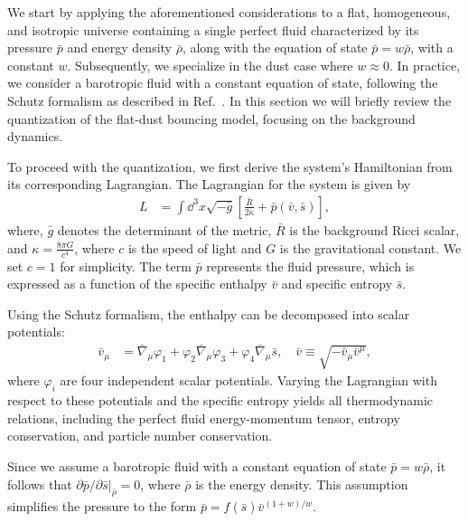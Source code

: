 \documentclass[a4paper,11pt]{article}
\begin{document}
{\color{red} We start by applying the aforementioned considerations to a flat,
	homogeneous, and isotropic universe containing a single perfect fluid characterized by
	its pressure $\bar{p}$ and energy density $\bar{\rho}$, along with the equation of state
	$\bar{p} = w\bar{\rho}$, with a constant $w$. Subsequently, we specialize in the dust
	case where $w \approx 0$. In practice, we consider a barotropic fluid with a constant
	equation of state, following the Schutz formalism as described in
	Ref.~\cite{fluidgeral}. In this section we will briefly review the quantization of the
	flat-dust bouncing model, focusing on the background dynamics.

	To proceed with the quantization, we first derive the system's Hamiltonian
	from its corresponding Lagrangian. The Lagrangian for the system is given by
	\begin{align}\label{lagrangian}
		L & = \int \dd^3x \sqrt{-\bar{g}} \left[\frac{\bar{R}}{2\kappa}
			+ \bar{p}(\bar{v}, \bar{s})\right],
	\end{align}
	where, $\bar{g}$ denotes the determinant of the metric, $\bar{R}$ is the background
	Ricci scalar, and $\kappa = \frac{8 \pi G}{c^4}$, where $c$ is the speed of
	light and $G$ is the gravitational constant. We set $c = 1$ for simplicity. The
	term $\bar{p}$ represents the fluid pressure, which is expressed as a function of
	the specific enthalpy $\bar{v}$ and specific entropy $\bar{s}$.

	Using the Schutz formalism, the enthalpy can be decomposed into scalar potentials:
	\begin{align}
		\bar{v}_\mu & = \bar\nabla_\mu \varphi_1
		+ \varphi_2 \bar\nabla_\mu \varphi_3
		+ \varphi_4 \bar\nabla_\mu \bar{s},
		\quad \bar{v} \equiv \sqrt{-\bar{v}_\mu \bar{v}^\mu},
	\end{align}
	where $\varphi_i$ are four independent scalar potentials. Varying the Lagrangian with
	respect to these potentials and the specific entropy yields all thermodynamic relations,
	including the perfect fluid energy-momentum tensor, entropy conservation, and particle
	number conservation.

	Since we assume a barotropic fluid with a constant equation of state $\bar{p} = w
		\bar{\rho}$, it follows that $\partial \bar{p} / \partial \bar{s} \vert_{\bar{\rho}} =
		0$, where $\bar{\rho}$ is the energy density. This assumption simplifies the pressure to
	the form $\bar{p} = f(\bar{s}) \bar{v}^{(1+w)/w}$.

}
\end{document}
